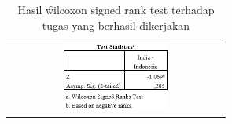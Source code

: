\begin{table}
	\centering
	\caption{Hasil \f{wilcoxon signed rank test} terhadap tugas yang berhasil dikerjakan}
	\label{tab:hasiltugasselesai}
	\begin{tabular}{c}
		\includegraphics[width=0.5\textwidth]
		{pics/selesaiWilcoxon.PNG}
	\end{tabular}
\end{table}
